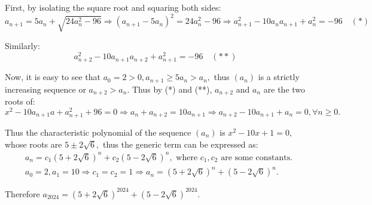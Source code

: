 \documentclass{article}
\begin{document}
\begin{soln}
    First, by isolating the square root and squaring both sides:
    \[
        a_{n+1} = 5a_n + \sqrt{24a_n^2 - 96} \Rightarrow (a_{n+1} - 5a_n)^2 = 24a_n^2 - 96 \Rightarrow a_{n+1}^2 - 10 a_n a_{n+1} + a_{n}^2 = -96 \quad (*)
    \]

    Similarly:
    \[
        a_{n+2}^2 - 10 a_{n+1} a_{n+2} + a_{n+1}^2 = -96 \quad (**)
    \]

    Now, it is easy to see that $a_0 = 2 > 0, a_{n+1} \ge 5a_n > a_n,$ thus $(a_n)$ is a strictly increasing sequence or $a_{n+2} > a_n.$
    Thus by (*) and (**), $a_{n+2}$ and $a_n$ are the two roots of:
    \[
        x^2 - 10 a_{n+1} a + a_{n+1}^2 + 96 = 0 \Rightarrow a_n + a_{n+2} = 10 a_{n+1} \Rightarrow a_{n+2} - 10a_{n+1} + a_n = 0, \forall n \ge 0.
    \]
    
    Thus the characteristic polynomial of the sequence $(a_n)$ is $x^2 - 10x+1=0,$ whose roots are $5 \pm 2\sqrt{6},$ thus the generic term can be expressed as:
    \[
        \begin{aligned}
            &a_n = c_1(5+2\sqrt{6})^n + c_2(5-2\sqrt{6})^n, \text{\ where } c_1, c_2 \text{\ are some constants.}\\
            &a_0 = 2, a_1 = 10 \Rightarrow c_1 = c_2 = 1 \Rightarrow a_n = (5+2\sqrt{6})^n + (5-2\sqrt{6})^n.
        \end{aligned}
    \]

    Therefore $a_{2024} = \boxed{(5+2\sqrt{6})^{2024} + (5-2\sqrt{6})^{2024}.}$
\end{soln}
\end{document}
